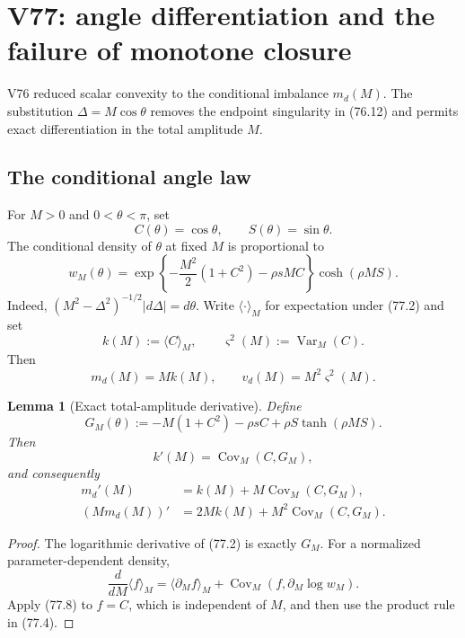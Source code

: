 \documentclass[11pt]{article}
\newtheorem{lemma}[theorem]{Lemma}
\theoremstyle{remark}
\begin{document}
\section{V77: angle differentiation and the failure of monotone closure}
\label{sec:v17v77}

V76 reduced scalar convexity to the conditional imbalance
\(m_d(M)\).  The substitution \(\Delta=M\cos\theta\) removes the
endpoint singularity in (76.12) and permits exact differentiation in
the total amplitude \(M\).

\subsection{The conditional angle law}

For \(M>0\) and \(0<\theta<\pi\), set
\[
 C(\theta)=\cos\theta,
 \qquad S(\theta)=\sin\theta.                     \tag{77.1}
\]
The conditional density of \(\theta\) at fixed \(M\) is proportional
to
\[
 w_M(\theta)
 =\exp\left\{-\frac{M^2}{2}(1+C^2)-\rho sMC\right\}
 \cosh(\rho MS).                                  \tag{77.2}
\]
Indeed,
\((M^2-\Delta^2)^{-1/2}|d\Delta|=d\theta\).
Write \(\langle\cdot\rangle_M\) for expectation under (77.2) and set
\[
 k(M):=\langle C\rangle_M,
 \qquad
 \varsigma^2(M):=\operatorname{Var}_M(C).         \tag{77.3}
\]
Then
\[
 m_d(M)=Mk(M),
 \qquad
 v_d(M)=M^2\varsigma^2(M).                        \tag{77.4}
\]

\begin{lemma}[Exact total-amplitude derivative]
\label{lem:v17v77-derivative}
Define
\[
 G_M(\theta)
 :=-M(1+C^2)-\rho sC
   +\rho S\tanh(\rho MS).                         \tag{77.5}
\]
Then
\[
\boxed{
 k'(M)=\operatorname{Cov}_M(C,G_M),}              \tag{77.6}
\]
and consequently
\[
\boxed{
\begin{aligned}
 m_d'(M)&=k(M)+M\operatorname{Cov}_M(C,G_M),\\
 (Mm_d(M))'&=2Mk(M)+M^2\operatorname{Cov}_M(C,G_M).
\end{aligned}}                                    \tag{77.7}
\]
\end{lemma}

\begin{proof}
The logarithmic derivative of (77.2) is exactly \(G_M\).  For a
normalized parameter-dependent density,
\[
 \frac d{dM}\langle f\rangle_M
 =\langle\partial_Mf\rangle_M
 +\operatorname{Cov}_M(f,\partial_M\log w_M).     \tag{77.8}
\]
Apply (77.8) to \(f=C\), which is independent of \(M\), and then use
the product rule in (77.4).
\end{proof}
\end{document}
